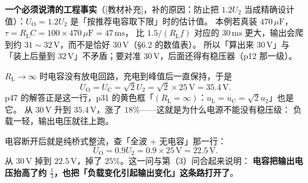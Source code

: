 \documentclass[11pt]{ctexart}
\begin{document}

\textbf{一个必须说清的工程事实}（[教材补充]，补的原因：防止把 $1.2U_2$ 当成精确设计值）：$U_{\mathrm{O}}=1.2U_2$ 是「按推荐电容取下限」时的估计值。
本例若真装 $470\,\mu\mathrm{F}$，$\tau=R_{\mathrm{L}}C=100\times470\,\mu\mathrm{F}=47\,\mathrm{ms}$，
比 $1.5/(R_{\mathrm{L}}f)$ 对应的 $30\,\mathrm{ms}$ 更大，输出会爬到约 $31\sim32\,\mathrm{V}$，而不是恰好 $30\,\mathrm{V}$（§6.2 的数值表）。
所以「算出来 $30\,\mathrm{V}$」与「装上后量到 $32\,\mathrm{V}$」不矛盾；要对准 $30\,\mathrm{V}$，后面还得有稳压器（p12 那一级）。


$R_{\mathrm{L}}\to\infty$ 时电容没有放电回路，充电到峰值后一直保持，于是
\[ U_{\mathrm{O}}=U_{\mathrm{C}}=\sqrt2U_2=\sqrt2\times25\,\mathrm{V}=35.4\,\mathrm{V} . \]
p47 的解答正是这一行，p31 的黄色框「$(R_{\mathrm{L}}=\infty)$：$u_{\mathrm{L}}=u_{\mathrm{C}}=\sqrt2u_2$」也是它。
从 $30\,\mathrm{V}$ 升到 $35.4\,\mathrm{V}$，涨了 $18\%$——这就是为什么电源不能没有稳压级：
负载一轻，输出电压就往上跑。


电容断开后就是纯桥式整流，查「全波 $+$ 无电容」那一行：
\[ U_{\mathrm{O}}=0.9U_2=0.9\times25\,\mathrm{V}=22.5\,\mathrm{V} . \]
从 $30\,\mathrm{V}$ 掉到 $22.5\,\mathrm{V}$，掉了 $25\%$。这一问与第（3）问合起来说明：
\textbf{电容把输出电压抬高了约 $\tfrac13$，也把「负载变化引起输出变化」这条路打开了}。

\end{document}

